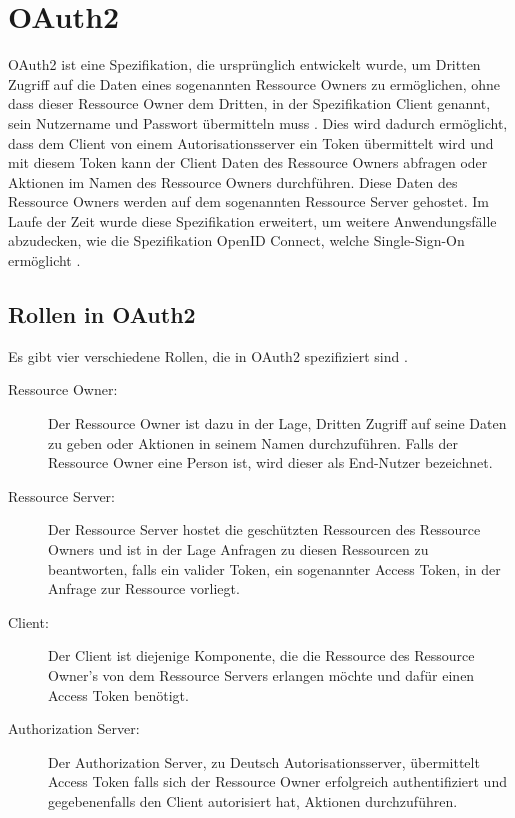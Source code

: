 %
%
\section{OAuth2}
\label{sec:OAuth2}
OAuth2 ist eine Spezifikation, die ursprünglich entwickelt wurde, um Dritten Zugriff auf die Daten eines sogenannten Ressource Owners zu ermöglichen, ohne dass dieser Ressource Owner dem Dritten, in der Spezifikation Client genannt, sein Nutzername und Passwort übermitteln muss \citep{oauth2:2012}. Dies wird dadurch ermöglicht, dass dem Client von einem Autorisationsserver ein Token übermittelt wird und mit diesem Token kann der Client Daten des Ressource Owners abfragen oder Aktionen im Namen des Ressource Owners durchführen. Diese Daten des Ressource Owners werden auf dem sogenannten Ressource Server gehostet.
Im Laufe der Zeit wurde diese Spezifikation erweitert, um weitere Anwendungsfälle abzudecken, wie die Spezifikation OpenID Connect, welche Single-Sign-On ermöglicht \citep{openidconnect:2014}. 

\subsection{Rollen in OAuth2}
\label{subsec:OAuth2:RolleninOAuth2}
Es gibt vier verschiedene Rollen, die in OAuth2 spezifiziert sind \citep{oauth2:2012}.

\begin{description}
  \item[Ressource Owner:] Der Ressource Owner ist dazu in der Lage, Dritten Zugriff auf seine Daten zu geben oder Aktionen in seinem Namen durchzuführen. Falls der Ressource Owner eine Person ist, wird dieser als End-Nutzer bezeichnet.
  \item[Ressource Server:] Der Ressource Server hostet die geschützten Ressourcen des Ressource Owners und ist in der Lage Anfragen zu diesen Ressourcen zu beantworten, falls ein valider Token, ein sogenannter Access Token, in der Anfrage zur Ressource vorliegt.
  \item[Client:] Der Client ist diejenige Komponente, die die Ressource des Ressource Owner's von dem Ressource Servers erlangen möchte und dafür einen Access Token benötigt. 
  \item[Authorization Server:] Der Authorization Server, zu Deutsch Autorisationsserver, übermittelt Access Token falls sich der Ressource Owner erfolgreich authentifiziert und gegebenenfalls den Client autorisiert hat, Aktionen durchzuführen. 
\end{description}

